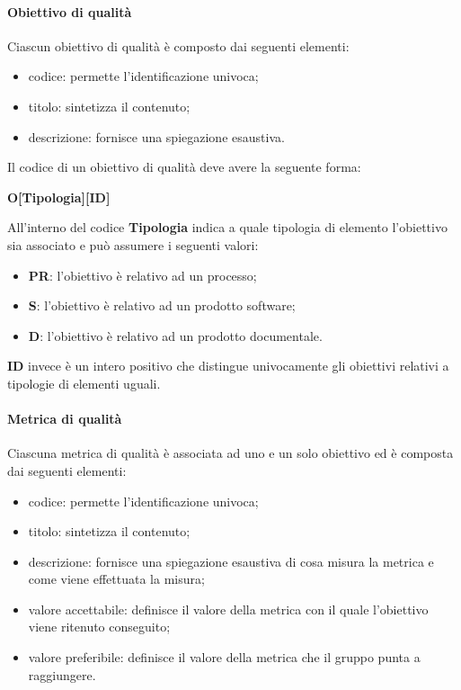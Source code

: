 \paragraph{Obiettivo di qualità}
\label{par:obiettivo_qualita}

Ciascun obiettivo di qualità è composto dai seguenti elementi:
\begin{itemize}
	\item codice: permette l'identificazione univoca;
	\item titolo: sintetizza il contenuto;
	\item descrizione: fornisce una spiegazione esaustiva.
\end{itemize}

Il codice di un obiettivo di qualità deve avere la seguente forma:
\begin{center}
	\textbf{O[Tipologia][ID]}
\end{center}
All'interno del codice \textbf{Tipologia} indica a quale tipologia di elemento l'obiettivo sia associato e può assumere i seguenti valori:
\begin{itemize}
	\item \textbf{PR}: l'obiettivo è relativo ad un processo;
	\item \textbf{S}: l'obiettivo è relativo ad un prodotto software;
    \item \textbf{D}: l'obiettivo è relativo ad un prodotto documentale.
\end{itemize}
\textbf{ID} invece è un intero positivo che distingue univocamente gli obiettivi relativi a tipologie di elementi uguali.

\paragraph{Metrica di qualità}
\label{par:metrica_qualita}

Ciascuna metrica di qualità è associata ad uno e un solo obiettivo ed è composta dai seguenti elementi:
\begin{itemize}
	\item codice: permette l'identificazione univoca;
	\item titolo: sintetizza il contenuto;
	\item descrizione: fornisce una spiegazione esaustiva di cosa misura la metrica e come viene effettuata la misura;
	\item valore accettabile: definisce il valore della metrica con il quale l'obiettivo viene ritenuto conseguito;
	\item valore preferibile: definisce il valore della metrica che il gruppo punta a raggiungere.
\end{itemize}

